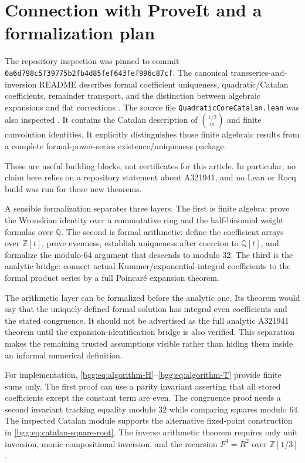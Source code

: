 \documentclass[11pt,a4paper]{article}
\numberwithin{equation}{section}
\theoremstyle{definition}
\theoremstyle{remark}
\theoremstyle{definition}
\newcommand{\Z}{\mathbb Z}
\newcommand{\Q}{\mathbb Q}
\newcommand{\repoSHA}{\texttt{0a6d798c5f39775b2fb4d85fef643fef996c87cf}}
\begin{document}
\section{Connection with ProveIt and a formalization plan}
\label{bgg:sec:proveit}

The repository inspection was pinned to commit \repoSHA. The canonical
transseries-and-inversion README describes formal coefficient uniqueness,
quadratic/Catalan coefficients, remainder transport, and the distinction
between algebraic expansions and flat corrections \cite{proveit-volume}.
The source file \texttt{QuadraticCoreCatalan.lean} was also inspected
\cite{proveit-catalan}. It contains the Catalan description of
$\binom{1/2}{m}$ and finite convolution identities. It explicitly distinguishes
those finite algebraic results from a complete formal-power-series
existence/uniqueness package.

These are useful building blocks, not certificates for this article. In
particular, no claim here relies on a repository statement about A321941,
and no Lean or Rocq build was run for these new theorems.

A sensible formalization separates three layers. The first is finite
algebra: prove the Wronskian identity over a commutative ring and the
half-binomial weight formulas over $\Q$. The second is formal arithmetic:
define the coefficient arrays over $\Z[t]$, prove evenness, establish
uniqueness after coercion to $\Q[t]$, and formalize the modulo-$64$ argument
that descends to modulo $32$. The third is the analytic bridge: connect
actual Kummer/exponential-integral coefficients to the formal product
series by a full Poincar\'e expansion theorem.

The arithmetic layer can be formalized before the analytic one. Its theorem
would say that the uniquely defined formal solution has integral even
coefficients and the stated congruence. It should not be advertised as the
full analytic A321941 theorem until the expansion-identification bridge is
also verified. This separation makes the remaining trusted assumptions
visible rather than hiding them inside an informal numerical definition.

For implementation, \eqref{bgg:eq:algorithm-H}--\eqref{bgg:eq:algorithm-T} provide
finite sums only. The first proof can use a parity invariant asserting that
all stored coefficients except the constant term are even. The congruence
proof needs a second invariant tracking equality modulo $32$ while comparing
squares modulo $64$. The inspected Catalan module supports the alternative
fixed-point construction in \eqref{bgg:eq:catalan-square-root}. The inverse
arithmetic theorem requires only unit inversion, monic compositional
inversion, and the recursion $F^3=R^2$ over $\Z[1/3]$.
\end{document}
